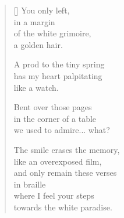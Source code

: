 \documentclass[twocolumn,11pt]{article}
\begin{document}
\begin{verse}[\versewidth]
  You only left, \\
  in a margin \\
  of the white grimoire, \\
  a golden hair.

  A prod to the tiny spring \\
  has my heart palpitating \\
  like a watch.

  Bent over those pages \\
  in the corner of a table \\
  we used to admire... what?

  The smile erases the memory, \\
  like an overexposed film, \\
  and only remain these verses \\
  in braille \\
  where I feel your steps \\
  towards the white paradise.
\end{verse}
\end{document}

